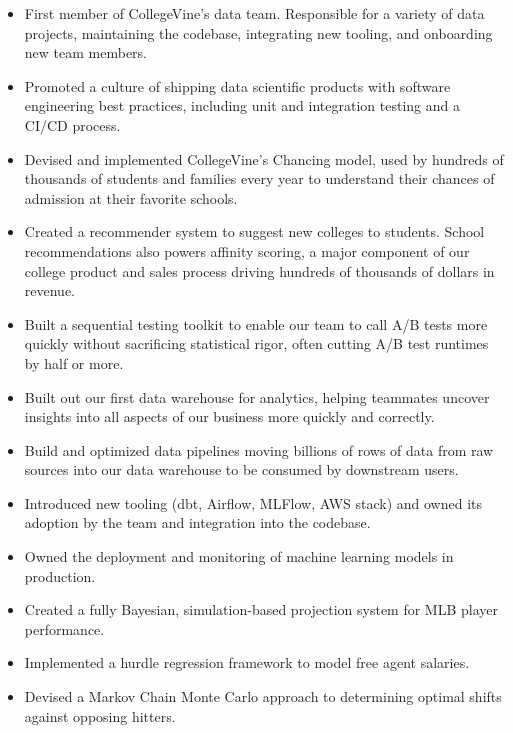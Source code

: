 \documentclass[10pt,a4paper,ragged2e,withhyper]{/Users/matt/documents/GitHub/mrkaye97.github.io/resume/altacv}
\begin{document}
	


	 \makecvheader
		
	
		\begin{itemize}
		\item First member of CollegeVine's data team. Responsible for a variety of data projects, maintaining the codebase, integrating new tooling, and onboarding new team members. 
		\item Promoted a culture of shipping data scientific products with software engineering best practices, including unit and integration testing and a CI/CD process.
		\item Devised and implemented CollegeVine's Chancing model, used by hundreds of thousands of students and families every year to understand their chances of admission at their favorite schools.
		\item Created a recommender system to suggest new colleges to students. School recommendations also powers affinity scoring, a major component of our college product and sales process driving hundreds of thousands of dollars in revenue.
		\item Built a sequential testing toolkit to enable our team to call A/B tests more quickly without sacrificing statistical rigor, often cutting A/B test runtimes by half or more.
		\item Built out our first data warehouse for analytics, helping teammates uncover insights into all aspects of our business more quickly and correctly.
		\item Build and optimized data pipelines moving billions of rows of data from raw sources into our data warehouse to be consumed by downstream users.
		\item Introduced new tooling (dbt, Airflow, MLFlow, AWS stack) and owned its adoption by the team and integration into the codebase.
		\item Owned the deployment and monitoring of machine learning models in production.
		\end{itemize}
		
		\divider
		

		\begin{itemize}
		\item Created a fully Bayesian, simulation-based projection system for MLB player performance.
		\item Implemented a hurdle regression framework to model free agent salaries.
		\item Devised a Markov Chain Monte Carlo approach to determining optimal shifts against opposing hitters.
		\end{itemize}
		
\end{document}
